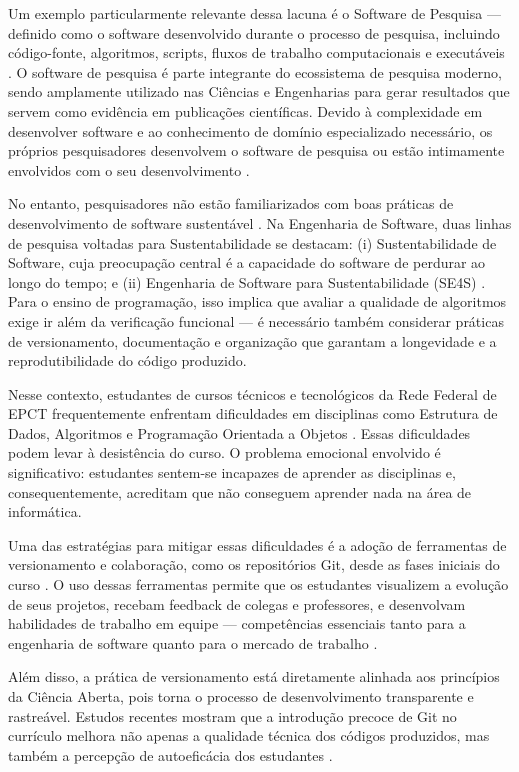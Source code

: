 \documentclass[english, spanish, brazilian]{RBIEarticle}
\begin{document}
Um exemplo particularmente relevante dessa lacuna é o Software de Pesquisa — definido como o software desenvolvido durante o processo de pesquisa, incluindo código-fonte, algoritmos, scripts, fluxos de trabalho computacionais e executáveis \cite{vonflach2023}. O software de pesquisa é parte integrante do ecossistema de pesquisa moderno, sendo amplamente utilizado nas Ciências e Engenharias para gerar resultados que servem como evidência em publicações científicas. Devido à complexidade em desenvolver software e ao conhecimento de domínio especializado necessário, os próprios pesquisadores desenvolvem o software de pesquisa ou estão intimamente envolvidos com o seu desenvolvimento \cite{carver2007}.

No entanto, pesquisadores não estão familiarizados com boas práticas de desenvolvimento de software sustentável \cite{vonflach2023}. Na Engenharia de Software, duas linhas de pesquisa voltadas para Sustentabilidade se destacam: (i) Sustentabilidade de Software, cuja preocupação central é a capacidade do software de perdurar ao longo do tempo; e (ii) Engenharia de Software para Sustentabilidade (SE4S) \cite{venters2021}. Para o ensino de programação, isso implica que avaliar a qualidade de algoritmos exige ir além da verificação funcional — é necessário também considerar práticas de versionamento, documentação e organização que garantam a longevidade e a reprodutibilidade do código produzido.

Nesse contexto, estudantes de cursos técnicos e tecnológicos da Rede Federal de EPCT frequentemente enfrentam dificuldades em disciplinas como Estrutura de Dados, Algoritmos e Programação Orientada a Objetos \cite{qian2017}. Essas dificuldades podem levar à desistência do curso. O problema emocional envolvido é significativo: estudantes sentem-se incapazes de aprender as disciplinas e, consequentemente, acreditam que não conseguem aprender nada na área de informática.

Uma das estratégias para mitigar essas dificuldades é a adoção de ferramentas de versionamento e colaboração, como os repositórios Git, desde as fases iniciais do curso \cite{vanGeest2024}. O uso dessas ferramentas permite que os estudantes visualizem a evolução de seus projetos, recebam feedback de colegas e professores, e desenvolvam habilidades de trabalho em equipe — competências essenciais tanto para a engenharia de software quanto para o mercado de trabalho \cite{borges2016}.

Além disso, a prática de versionamento está diretamente alinhada aos princípios da Ciência Aberta, pois torna o processo de desenvolvimento transparente e rastreável. Estudos recentes mostram que a introdução precoce de Git no currículo melhora não apenas a qualidade técnica dos códigos produzidos, mas também a percepção de autoeficácia dos estudantes \cite{momcheva2025}.
\end{document}

